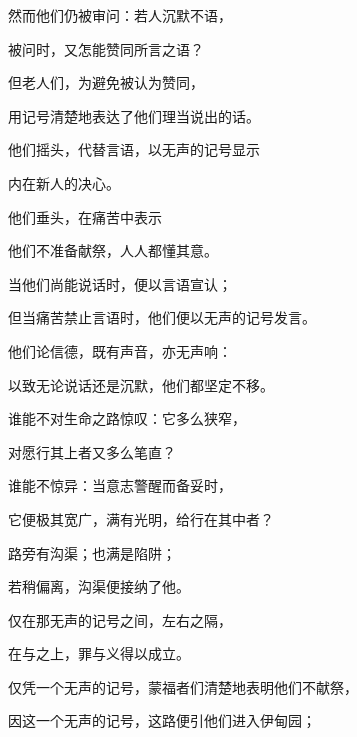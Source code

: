 然而他们仍被审问：若人沉默不语，\par

被问时，又怎能赞同所言之语？\par

但老人们，为避免被认为赞同，\par

用记号清楚地表达了他们理当说出的话。\par

他们摇头，代替言语，以无声的记号显示\par

内在新人的决心。\par

他们垂头，在痛苦中表示\par

他们不准备献祭，人人都懂其意。\par

当他们尚能说话时，便以言语宣认；\par

但当痛苦禁止言语时，他们便以无声的记号发言。\par

他们论信德，既有声音，亦无声响：\par

以致无论说话还是沉默，他们都坚定不移。\par

谁能不对生命之路惊叹：它多么狭窄，\par

对愿行其上者又多么笔直？\par

谁能不惊异：当意志警醒而备妥时，\par

它便极其宽广，满有光明，给行在其中者？\par

路旁有沟渠；也满是陷阱；\par

若稍偏离，沟渠便接纳了他。\par

仅在那无声的记号之间，左右之隔，\par

在与之上，罪与义得以成立。\par

仅凭一个无声的记号，蒙福者们清楚地表明他们不献祭，\par

因这一个无声的记号，这路便引他们进入伊甸园；\par

